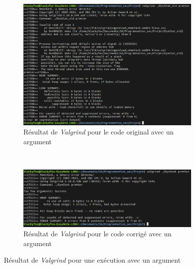\begin{figure}[H]
  \begin{subfigure}[b]{0.45\textwidth}
    \includegraphics[width=\textwidth]{img/conc5.png}
    \caption{Résultat de \textit{Valgrind} pour le code original avec un argument}
  \end{subfigure}
  ~
  \begin{subfigure}[b]{0.45\textwidth}
    \includegraphics[width=\textwidth]{img/conc6.png}
    \caption{Résultat de \textit{Valgrind} pour le code corrigé avec un argument}
  \end{subfigure}
  \caption{Résultat de \textit{Valgrind} pour une exécution avec un argument}
\end{figure}

